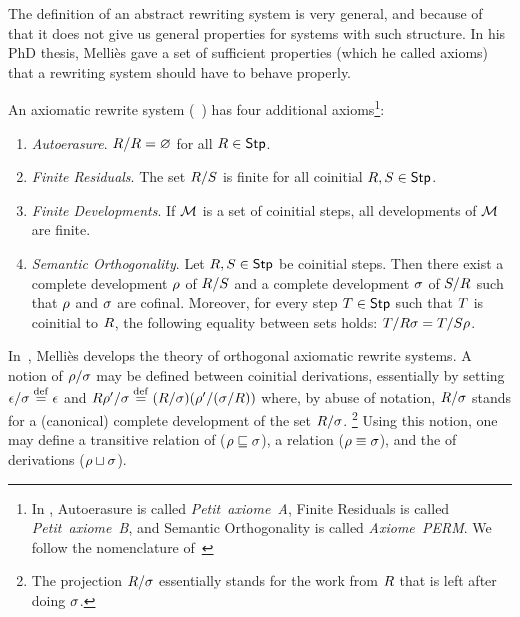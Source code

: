 The definition of an abstract rewriting system is very general, and because of that it does not give us
general properties for systems with such structure.
In his PhD thesis, Melliès gave a set of sufficient properties (which he called axioms)
that a rewriting system should have to behave properly.

An  axiomatic rewrite system (\cf~\cite[Sec.~2.3]{thesismellies})
has four additional axioms\footnote{In \cite{thesismellies},
Autoerasure is called \textit{Petit~axiome~A},
Finite Residuals is called \textit{Petit~axiome~B},
and Semantic Orthogonality is called \textit{Axiome~PERM}.
We follow the nomenclature of~\cite{DBLP:conf/popl/AccattoliBKL14}}:
\begin{enumerate}
\item {\em Autoerasure}.
  $R/R = \varnothing$ for all $R \in \mathsf{Stp}$.
\item {\em Finite Residuals}.
  The set $R/S$ is finite for all coinitial $R,S \in \mathsf{Stp}$.
\item {\em Finite Developments}.
  If $\mathcal{M}$ is a set of coinitial steps,
  all developments of $\mathcal{M}$ are finite.
\item {\em Semantic Orthogonality}.
  Let $R,S \in \mathsf{Stp}$ be coinitial steps.
  Then there exist a complete development $\rho$ of $R/S$
  and a complete development $\sigma$ of $S/R$
  such that $\rho$ and $\sigma$ are cofinal.
  Moreover,
  for every step $T \in \mathsf{Stp}$ such that $T$ is coinitial to $R$,
  the following equality between sets holds:
  $T/R\sigma = T/S\rho$.
\end{enumerate}
In~\cite{thesismellies}, Melli\`es develops
the theory of orthogonal axiomatic rewrite systems.
A notion of 
$\rho/\sigma$ may be defined between coinitial derivations,
essentially by setting $\epsilon/\sigma \overset{\mathrm{def}}{=} \epsilon$
and $R\rho'/\sigma \overset{\mathrm{def}}{=} (R/\sigma)(\rho'/(\sigma/R))$
where, by abuse of notation, $R/\sigma$ stands for a (canonical) complete development
of the set $R/\sigma$.
\footnote{The projection $R / \sigma$ essentially stands for the work from
$R$ that is left after doing $\sigma$.}
Using this notion, one may define
a transitive relation of  ($\rho \sqsubseteq \sigma$),
a  relation ($\rho \equiv \sigma$),
and the  of derivations ($\rho \sqcup \sigma$).
